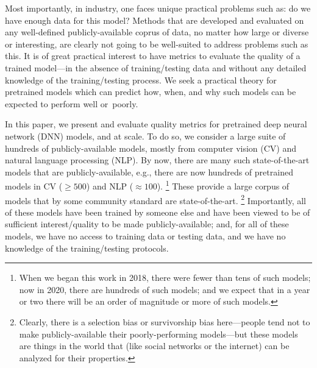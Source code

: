 Most importantly, in industry, one faces unique practical problems such as: do we have enough data for this model? 
Methods that are developed and evaluated on any well-defined publicly-available coprus of data, no matter how large or diverse or interesting, are clearly not going to be well-suited to address problems such as this.
It is of great practical interest to have metrics to evaluate the quality of a trained model---in the absence of training/testing data and without any detailed knowledge of the training/testing process.  
We seek a practical theory for pretrained models which can predict how, when, and why such models can be expected to perform well or~poorly.

In this paper, we present and evaluate quality metrics for pretrained deep neural network (DNN) models, and at scale.
To do so, we consider a large suite of hundreds of publicly-available models, mostly from computer vision (CV) and natural language processing (NLP).
%
By now, there are many such state-of-the-art models that are publicly-available, e.g., 
there are now hundreds of pretrained models in CV ($\ge 500$) and NLP ($\approx 100$).%
\footnote{When we began this work in 2018, there were fewer than tens of such models; now in 2020, there are hundreds of such models; and we expect that in a year or two there will be an order of magnitude or more of such models.}
These provide a large corpus of models that by some community standard are state-of-the-art.%
\footnote{Clearly, there is a selection bias or survivorship bias here---people tend not to make publicly-available their poorly-performing models---but these models are things in the world that (like social networks or the internet) can be analyzed for their properties.}
Importantly, all of these models have been trained by someone else and have been viewed to be of sufficient interest/quality to be made publicly-available; and, for all of these models, we have no access to training data or testing data, and we have no knowledge of the training/testing protocols. 

